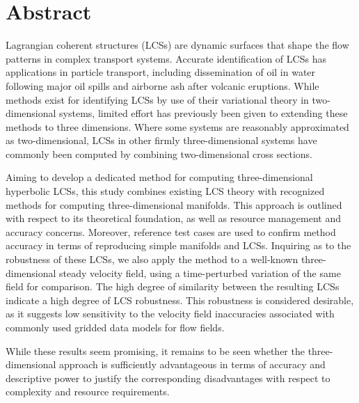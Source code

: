 \section*{Abstract}

Lagrangian coherent structures (LCSs) are dynamic surfaces that shape the flow patterns in complex transport systems. Accurate identification of LCSs has applications in particle transport, including dissemination of oil in water following major oil spills and airborne ash after volcanic eruptions. While methods exist for identifying LCSs by use of their variational theory in two-dimensional systems, limited effort has previously been given to extending these methods to three dimensions. Where some systems are reasonably approximated as two-dimensional, LCSs in other firmly three-dimensional systems have commonly been computed by combining two-dimensional cross sections. 

Aiming to develop a dedicated method for computing three-dimensional hyperbolic LCSs, this study combines existing LCS theory with recognized methods for computing three-dimensional manifolds. This approach is outlined with respect to its theoretical foundation, as well as resource management and accuracy concerns. Moreover, reference test cases are used to confirm method accuracy in terms of reproducing simple manifolds and LCSs. Inquiring as to the robustness of these LCSs, we also apply the method to a well-known three-dimensional steady velocity field, using a time-perturbed variation of the same field for comparison. The high degree of similarity between the resulting LCSs indicate a high degree of LCS robustness. This robustness is considered desirable, as it suggests low sensitivity to the velocity field inaccuracies associated with commonly used gridded data models for flow fields. 

While these results seem promising, it remains to be seen whether the three-dimensional approach is sufficiently advantageous in terms of accuracy and descriptive power to justify the corresponding disadvantages with respect to complexity and resource requirements.

